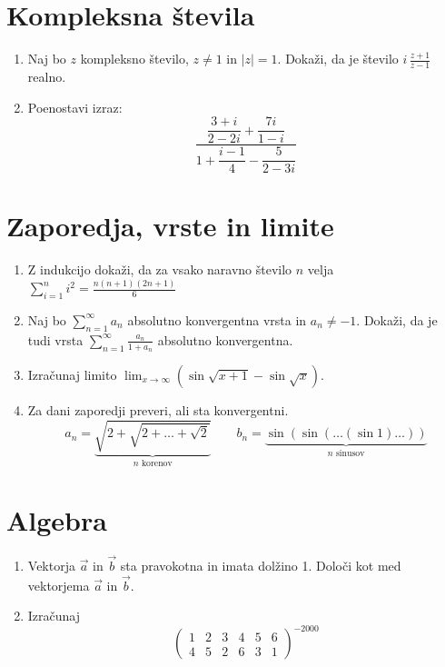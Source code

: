 \documentclass[a4paper,12pt]{article}
\begin{document}
\section*{Kompleksna števila}

\begin{enumerate}
\item
Naj bo \(z\) kompleksno število, \(z \ne 1\) in \(|z| = 1\).
Dokaži, da je število \(i \, \frac{z+1}{z-1}\) realno.

\item
Poenostavi izraz:
\[
\frac{\dfrac{3+i}{2-2i} + \dfrac{7i}{1-i}}{1 + \dfrac{i-1}{4} - \dfrac{5}{2-3i}}
\]
\end{enumerate}

\section*{Zaporedja, vrste in limite}

\begin{enumerate}
\item
Z indukcijo dokaži, da za vsako naravno število \(n\) velja
\(\sum_{i=1}^{n} i^2 = \frac{n(n+1)(2n+1)}{6}\)

\item
Naj bo \(\sum_{n=1}^\infty a_n\) absolutno konvergentna vrsta in \(a_n \ne -1\).
Dokaži, da je tudi vrsta \(\sum_{n=1}^\infty \frac{a_n}{1+a_n}\)
absolutno konvergentna.

\item
Izračunaj limito
\(\lim_{x \to \infty}(\sin\sqrt{x+1} - \sin\sqrt{x})\).

\item
Za dani zaporedji preveri, ali sta konvergentni.
\[
a_n = \underbrace{\sqrt{2+\sqrt{2+\dots+\sqrt{2}}}}_{n\text{ korenov}} \qquad b_n = \underbrace{\sin(\sin(\dots(\sin 1)\dots))}_{n\text{ sinusov}}
\]
\end{enumerate}

\section*{Algebra}

\begin{enumerate}
\item
Vektorja \(\vec{a}\) in \(\vec{b}\) sta pravokotna in imata dolžino 1. Določi kot med vektorjema \(\vec{a}\) in \(\vec{b}\).

\item
Izračunaj
\[
\begin{pmatrix}
     1 & 2 & 3 & 4 & 5 & 6 \\
     4 & 5 & 2 & 6 & 3 & 1
\end{pmatrix}^{-2000}
\]
\end{enumerate}
\end{document}
